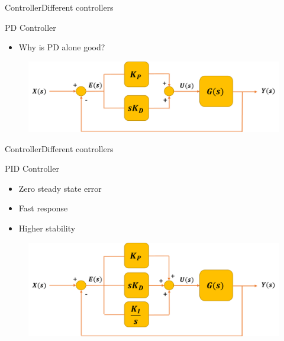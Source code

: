 \begin{frame}{Controller}{Different controllers}
  \begin{block}{PD Controller}

	  \begin{itemize}
	  	\item Why is PD alone good?
	  \end{itemize}

	  \begin{figure}
        \includegraphics[scale=0.26]{../report/figures/PD_controller.png}
      \end{figure}
  
  \end{block}
\end{frame}

\begin{frame}{Controller}{Different controllers}
  \begin{block}{PID Controller}

	  \begin{itemize}
	  	\item Zero steady state error
	  	\item Fast response
	  	\item Higher stability
	  \end{itemize}

	  \begin{figure}
        \includegraphics[scale=0.26]{../report/figures/PID_controller.png}
      \end{figure}
  
  \end{block}
\end{frame}

